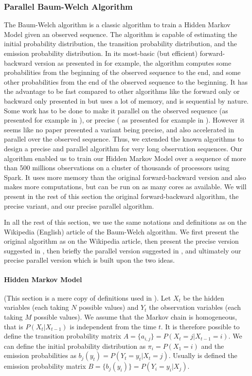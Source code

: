 \subsubsection{Parallel Baum-Welch Algorithm}
The Baum-Welch algorithm is a classic algorithm to train a Hidden Markov Model given an observed sequence. The algorithm is capable of estimating the initial probability distribution, the transition probability distribution, and the emission probability distribution.
In its most-basic (but efficient) forward-backward version as presented in \cite{rabiner1989tutorial} for example, the algorithm computes some probabilities from the beginning of the observed sequence to the end, and some other probabilities from the end of the observed sequence to the beginning. It has the advantage to be fast compared to other algorithms like the forward only or backward only presented in \cite{turin1998unidirectional} but uses a lot of memory, and is sequential by nature.
Some work has to be done to make it parallel on the observed sequence (as presented for example in \cite{turin1998unidirectional}), or precise ( as presented for example in \cite{rabiner1989tutorial}). However it seems like no paper presented a variant being precise, and also accelerated in parallel over the observed sequence.
Thus, we extended the known algorithms to design a precise and parallel algorithm for very long observation sequences.
Our algorithm enabled us to train our Hidden Markov Model over a sequence of more than 500 millions observations on a cluster of thousands of processors using Spark. It uses more memory than the original forward-backward version and also makes more computations, but can be run on as many cores as available.
We will present in the rest of this section the original forward-backward algorithm, the precise variant, and our precise parallel algorithm.

In all the rest of this section, we use the same notations and definitions as on the Wikipedia (English) article of the Baum-Welch algorithm. We first present the original algorithm as on the Wikipedia article, then present the precise version suggested in \cite{rabiner1989tutorial}, then briefly the parallel version suggested in \cite{turin1998unidirectional}, and ultimately our precise parallel version which is built upon the two ideas.

\paragraph{Hidden Markov Model}
(This section is a mere copy of definitions used in \cite{wiki:BaumWelch_algorithm}).
Let $X_t$ be the hidden variables (each taking $N$ possible values) and $Y_t$ the observation variables (each taking $M$ possible values). We assume that the Markov chain is homogeneous, that is $P(X_t|X_{t-1})$ is independent from the time $t$.
It is therefore possible to define the transition probability matrix $A = \{a_{i,j}\} = P(X_t = j | X_{t-1} = i)$.
We can define the initial probability distribution as $\pi_i = P(X_1=i)$ and the emission probabilities as $b_j(y_t) = P(Y_t = y_t | X_t = j)$. Usually is defined the emission probability matrix $B = \{b_j(y_i)\} = P(Y_i=y_i | X_j)$.

